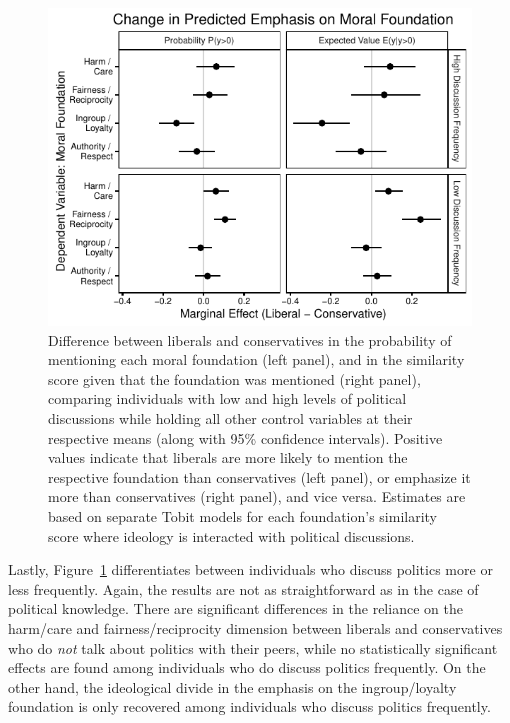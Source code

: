 \documentclass[12pt]{article}
\begin{document}
\begin{figure}[ht]\centering
\includegraphics{../calc/fig/tobit_ideol_disc.pdf}
\caption{Difference between liberals and conservatives in the probability of mentioning each moral foundation (left panel), and in the similarity score given that the foundation was mentioned (right panel), comparing individuals with low and high levels of political discussions while holding all other control variables at their respective means (along with 95\% confidence intervals). Positive values indicate that liberals are more likely to mention the respective foundation than conservatives (left panel), or emphasize it more than conservatives (right panel), and vice versa. Estimates are based on separate Tobit models for each foundation's similarity score where ideology is interacted with political discussions.}\label{fig:tobit_ideol_disc}
\end{figure}

Lastly, Figure~\ref{fig:tobit_ideol_disc} differentiates between individuals who discuss politics more or less frequently. Again, the results are not as straightforward as in the case of political knowledge. There are significant differences in the reliance on the harm/care and fairness/reciprocity dimension between liberals and conservatives who do \textit{not} talk about politics with their peers, while no statistically significant effects are found among individuals who do discuss politics frequently. On the other hand, the ideological divide in the emphasis on the ingroup/loyalty foundation is only recovered among individuals who discuss politics frequently.
\end{document}
